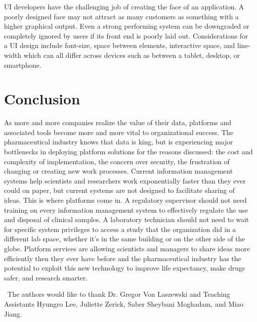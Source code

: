 \documentclass[sigconf]{acmart}
\begin{document}
UI developers have the challenging job of creating the face of an application. A poorly designed face may not attract as many customers as something with a higher graphical output. Even a strong performing system can be downgraded or completely ignored by users if its front end is poorly laid out. Considerations for a UI design include font-size, space between elements, interactive space, and line-width which can all differ across devices such as between a tablet, desktop, or smartphone\cite{Macik}. 

\section{Conclusion}
As more and more companies realize the value of their data, platforms and associated tools become more and more vital to organizational success. The pharmaceutical industry knows that data is king, but is experiencing major bottlenecks in deploying platform solutions for the reasons discussed: the cost and complexity of implementation, the concern over security, the frustration of changing or creating new work processes. Current information management systems help scientists and researchers work exponentially faster than they ever could on paper, but current systems are not designed to facilitate sharing of ideas. This is where platforms come in. A regulatory supervisor should not need training on every information management system to effectively regulate the use and disposal of clinical samples. A laboratory technician should not need to wait for specific system privileges to access a study that the organization did in a different lab space, whether it's in the same building or on the other side of the globe. Platform services are allowing scientists and managers to share ideas more efficiently then they ever have before and the pharmaceutical industry has the potential to exploit this new technology to improve life expectancy, make drugs safer, and research smarter. 

\begin{acks}

  The authors would like to thank Dr. Gregor Von Laszewski  and Teaching Assistants Hyungro Lee, Juliette Zerick, Saber Sheybani Moghadam, and Miao Jiang.

\end{acks}


 


\end{document}
